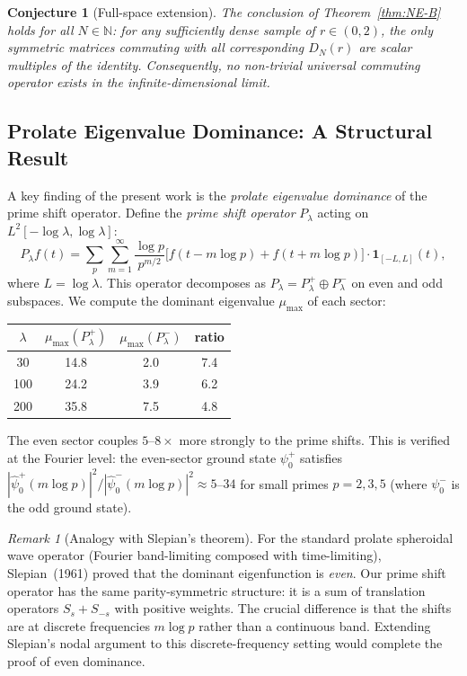 \documentclass[12pt,a4paper]{article}
\newtheorem{conjecture}[theorem]{Conjecture}
\theoremstyle{definition}
\theoremstyle{remark}
\newtheorem{remark}[theorem]{Remark}
\begin{document}
\begin{conjecture}[Full-space extension]\label{conj:NE-B-full}
The conclusion of Theorem~\ref{thm:NE-B} holds for all $N \in \mathbb{N}$: for any sufficiently dense sample of $r \in (0,2)$, the only symmetric matrices commuting with all corresponding $D_N(r)$ are scalar multiples of the identity. Consequently, no non-trivial universal commuting operator exists in the infinite-dimensional limit.
\end{conjecture}

\subsection{Prolate Eigenvalue Dominance: A Structural Result}

A key finding of the present work is the \emph{prolate eigenvalue dominance} of the prime shift operator. Define the \emph{prime shift operator} $P_\lambda$ acting on $L^2[-\log\lambda, \log\lambda]$:
\[ P_\lambda f(t) = \sum_p \sum_{m=1}^\infty \frac{\log p}{p^{m/2}} \bigl[f(t - m\log p) + f(t + m\log p)\bigr] \cdot \mathbf{1}_{[-L,L]}(t), \]
where $L = \log\lambda$. This operator decomposes as $P_\lambda = P_\lambda^+ \oplus P_\lambda^-$ on even and odd subspaces. We compute the dominant eigenvalue $\mu_{\max}$ of each sector:

\begin{center}
\begin{tabular}{cccc}
$\lambda$ & $\mu_{\max}(P_\lambda^+)$ & $\mu_{\max}(P_\lambda^-)$ & ratio \\
\hline
30  & 14.8 &  2.0 & 7.4 \\
100 & 24.2 &  3.9 & 6.2 \\
200 & 35.8 &  7.5 & 4.8
\end{tabular}
\end{center}

The even sector couples $5$--$8\times$ more strongly to the prime shifts. This is verified at the Fourier level: the even-sector ground state $\psi_0^+$ satisfies $|\hat\psi_0^+(m\log p)|^2 / |\hat\psi_0^-(m\log p)|^2 \approx 5$--$34$ for small primes $p = 2,3,5$ (where $\psi_0^-$ is the odd ground state).

\begin{remark}[Analogy with Slepian's theorem]
For the standard prolate spheroidal wave operator (Fourier band-limiting composed with time-limiting), Slepian~(1961) proved that the dominant eigenfunction is \emph{even}. Our prime shift operator has the same parity-symmetric structure: it is a sum of translation operators $S_s + S_{-s}$ with positive weights. The crucial difference is that the shifts are at discrete frequencies $m\log p$ rather than a continuous band. Extending Slepian's nodal argument to this discrete-frequency setting would complete the proof of even dominance.
\end{remark}
\end{document}
